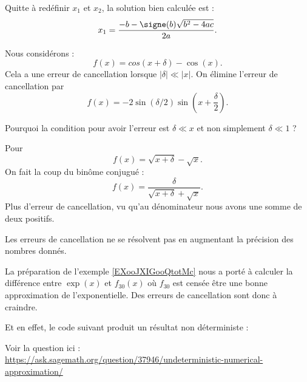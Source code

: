 Quitte à redéfinir \( x_1\) et \( x_2\), la solution bien calculée est :
\begin{equation}
	x_1=\frac{ -b-\signe(b)\sqrt{b^2-4ac} }{ 2a }.
\end{equation}

\begin{example}
	Nous considérons :
	\begin{equation}
		f(x)=cos(x+\delta)-\cos(x).
	\end{equation}
	Cela a une erreur de cancellation lorsque \( | \delta |\ll | x |\). On élimine l'erreur de cancellation par
	\begin{equation}
		f(x)=-2\sin(\delta/2)\sin\left( x+\frac{ \delta }{ 2 } \right).
	\end{equation}

	\begin{probleme}
		Pourquoi la condition pour avoir l'erreur est \( \delta\ll x\) et non simplement \( \delta\ll 1\) ?
	\end{probleme}

\end{example}

\begin{example}
	Pour
	\begin{equation}
		f(x)=\sqrt{x+\delta}-\sqrt{x}.
	\end{equation}
	On fait la coup du binôme conjugué :
	\begin{equation}
		f(x)=\frac{ \delta }{ \sqrt{x+\delta}+\sqrt{x} }.
	\end{equation}
	Plus d'erreur de cancellation, vu qu'au dénominateur nous avons une somme de deux positifs.
\end{example}

Les erreurs de cancellation ne se résolvent pas en augmentant la précision des nombres donnés.

\begin{example}
    La préparation de l'exemple \ref{EXooJXIGooQtotMc} nous a porté à calculer la différence entre \( \exp(x)\) et \( f_{30}(x)\) où \( f_{30}\) est censée être une bonne approximation de l'exponentielle. Des erreurs de cancellation sont donc à craindre.

Et en effet, le code suivant produit un résultat non déterministe :


Voir la question ici :\\ \url{https://ask.sagemath.org/question/37946/undeterministic-numerical-approximation/}

\end{example}

